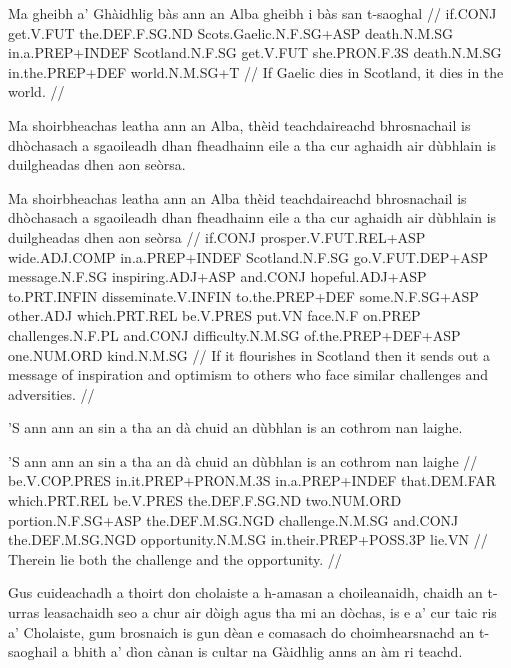 \documentclass[a4paper,10pt]{article}
\begin{document}
\vspace{4mm}
\gla Ma gheibh a' Ghàidhlig bàs {ann an} Alba gheibh i bàs san t-saoghal  //
\glb if.CONJ get.V.FUT the.DEF.F.SG.ND Scots.Gaelic.N.F.SG+ASP death.N.M.SG in.a.PREP+INDEF Scotland.N.F.SG get.V.FUT she.PRON.F.3S death.N.M.SG in.the.PREP+DEF world.N.M.SG+T  //
\glft If Gaelic dies in Scotland, it dies in the world. //
\endgl
\xe

\ex
\begingl
\glpre Ma shoirbheachas leatha ann an Alba, thèid teachdaireachd bhrosnachail is dhòchasach a sgaoileadh dhan fheadhainn eile a tha cur aghaidh air dùbhlain is duilgheadas dhen aon seòrsa. 

\vspace{4mm}
\gla Ma shoirbheachas leatha {ann an} Alba thèid teachdaireachd bhrosnachail is dhòchasach a sgaoileadh dhan fheadhainn eile a tha cur aghaidh air dùbhlain is duilgheadas dhen aon seòrsa  //
\glb if.CONJ prosper.V.FUT.REL+ASP wide.ADJ.COMP in.a.PREP+INDEF Scotland.N.F.SG go.V.FUT.DEP+ASP message.N.F.SG inspiring.ADJ+ASP and.CONJ hopeful.ADJ+ASP to.PRT.INFIN disseminate.V.INFIN to.the.PREP+DEF some.N.F.SG+ASP other.ADJ which.PRT.REL be.V.PRES put.VN face.N.F on.PREP challenges.N.F.PL and.CONJ difficulty.N.M.SG of.the.PREP+DEF+ASP one.NUM.ORD kind.N.M.SG  //
\glft If it flourishes in Scotland then it sends out a message of inspiration and optimism to others who face similar challenges and adversities. //
\endgl
\xe

\ex
\begingl
\glpre 'S ann ann an sin a tha an dà chuid an dùbhlan is an cothrom nan laighe. 

\vspace{4mm}
\gla 'S ann {ann an} sin a tha an dà chuid an dùbhlan is an cothrom nan laighe  //
\glb be.V.COP.PRES in.it.PREP+PRON.M.3S in.a.PREP+INDEF that.DEM.FAR which.PRT.REL be.V.PRES the.DEF.F.SG.ND two.NUM.ORD portion.N.F.SG+ASP the.DEF.M.SG.NGD challenge.N.M.SG and.CONJ the.DEF.M.SG.NGD opportunity.N.M.SG in.their.PREP+POSS.3P lie.VN  //
\glft Therein lie both the challenge and the opportunity. //
\endgl
\xe

\ex
\begingl
\glpre Gus cuideachadh a thoirt don cholaiste a h-amasan a choileanaidh, chaidh an t-urras leasachaidh seo a chur air dòigh agus tha mi an dòchas, is e a' cur taic ris a' Cholaiste, gum brosnaich is gun dèan e comasach do choimhearsnachd an t-saoghail a bhith a' dìon cànan is cultar na Gàidhlig anns an àm ri teachd. 
\end{document}
